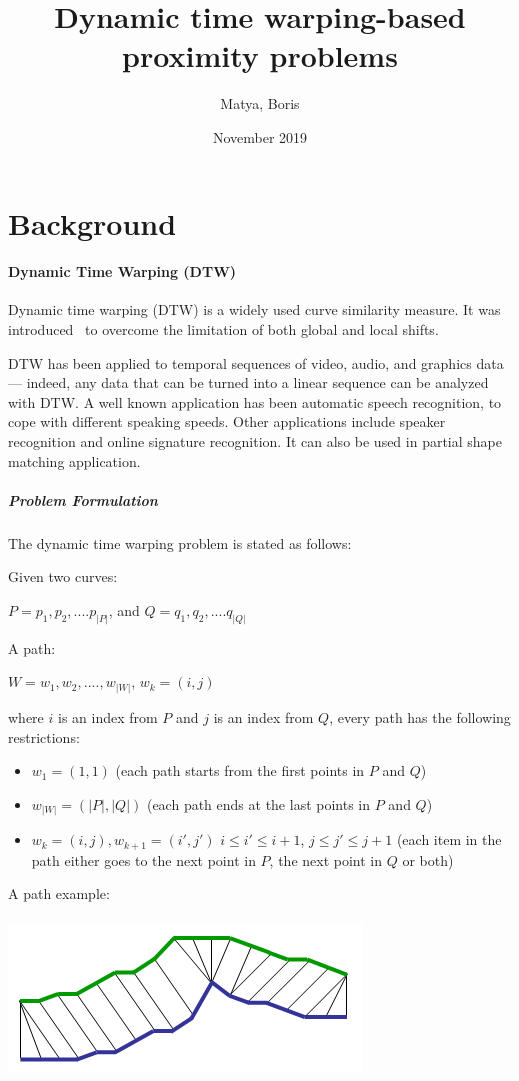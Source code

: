 \documentclass{article}
\title{%
Dynamic time warping-based proximity problems}
\author{Matya, Boris}
\date{November 2019}
\theoremstyle{remark}
\theoremstyle{definition}
\begin{document}
\maketitle

\section{Background}

\paragraph{Dynamic Time Warping (DTW)}
Dynamic time warping (DTW) is a widely used curve similarity measure.
It was introduced~\cite{Keogh:2002:NTS:775047.775062} to
overcome the limitation of both global and local shifts.


DTW has been applied to temporal sequences of video, audio, and graphics data — indeed, any data that can be turned into a linear sequence can be analyzed with DTW. A well known application has been automatic speech recognition, to cope with different speaking speeds. Other applications include speaker recognition and online signature recognition. It can also be used in partial shape matching application\cite{wiki:Dynamic_time_warping}.

\subparagraph{Problem Formulation}
The dynamic time warping problem is stated as follows:


Given two curves:
\begin{center}
    $P=p_1, p_2,....p_{|P|}$, and $Q=q_1, q_2,....q_{|Q|}$
\end{center}
A path:
\begin{center}
    $W=w_1,w_2,....,w_{|W|}$, $w_k = (i, j)$
\end{center}
where $i$ is an index from $P$ and $j$ is an index from $Q$, every path has the following restrictions:

\begin{itemize}
    \item $w_1 = (1, 1)$ (each path starts from the first points in $P$ and $Q$)
    \item $w_{|W|} = (|P|, |Q|)$ (each path ends at the last points in $P$ and $Q$)
    \item $w_k = (i, j), w_{k+1} = (i',j')$ \qquad $i\leq i' \leq i+1$,  $j \leq j' \leq j+1$ (each item in the path either goes to the next point in $P$, the next point in $Q$ or both)
\end{itemize}
A path example:
\paragraph{}
\includegraphics{aligned}
\end{document}
